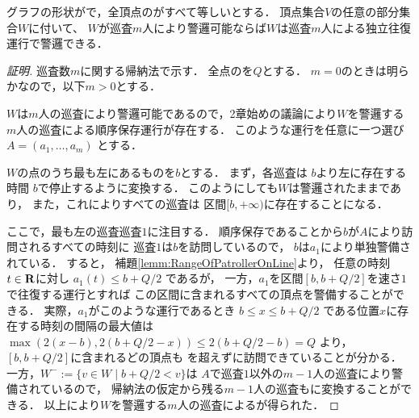 \begin{lemm}
\label{lemm:LineEqualTimelimitIndependentInterval}
グラフの形状が{\graphLine}で，全頂点の{\maxIdletime}がすべて等しいとする．
頂点集合$V$の任意の部分集合$W$に付いて、
$W$が巡査$m$人により警邏可能ならば$W$は巡査$m$人による独立往復運行で警邏できる．
\end{lemm}
\begin{proof}[証明]
\newcommand{\leftmostpoint}{b}  %
\newcommand{\newpatroller}{l}
\newcommand{\leftmostpatroller}{巡査1}
\newcommand{\leftmostpatOpr}{a_1}

巡査数$m$に関する帰納法で示す．
全点の{\maxIdletime}を$Q$とする．
$m = 0$のときは明らかなので，以下$m > 0$とする．

$W$は$m$人の巡査により警邏可能であるので，2章始めの議論により$W$を警邏する$m$人の巡査による順序保存運行が存在する．
このような運行を任意に一つ選び
$A = (a _1, \ldots, a _m)$
とする．

$W$の点のうち最も左にあるものを$\leftmostpoint$とする．
まず，各巡査は
$\leftmostpoint$より左に存在する時間
$\leftmostpoint$で停止するように変換する．
このようにしても$W$は警邏されたままであり，
また，これによりすべての巡査は
区間$[\leftmostpoint, +\infty)$に存在することになる．

ここで，最も左の巡査$\leftmostpatroller$に注目する．
順序保存であることから$\leftmostpoint$が$A$により訪問されるすべての時刻に
$\leftmostpatroller$は$\leftmostpoint$を訪問しているので，
$\leftmostpoint$は$\leftmostpatOpr$により単独警備されている．
%
すると，
補題\ref{lemm:RangeOfPatrollerOnLine}より，
任意の時刻$t \in \mathbf R$に対し
$\leftmostpatOpr(t) \leq \leftmostpoint + Q/2$
であるが，
%
一方，$\leftmostpatOpr$を区間$[b, b + Q/2]$を速さ$1$で往復する運行とすれば
この区間に含まれるすべての頂点を警備することができる．
実際，$\leftmostpatOpr$がこのような運行であるとき
$\leftmostpoint \leq x \leq \leftmostpoint + Q/2$
である位置$x$に存在する時刻の間隔の最大値は
$ \max( 2(x - \leftmostpoint), 2(\leftmostpoint + Q/2 - x) )
  \leq 2(\leftmostpoint + Q/2 - \leftmostpoint) = Q $
より，$[\leftmostpoint, \leftmostpoint + Q/2]$に含まれるどの頂点も
{\maxIdletime}を超えずに訪問できていることが分かる．
%
一方，$W^- := \{ v \in W \mid \leftmostpoint + Q/2 < v \}$は
$A$で$\leftmostpatroller$以外の$m - 1$人の巡査により警備されているので，
帰納法の仮定から残る$m - 1$人の巡査も{\indSectOperation}に変換することができる．
以上により$W$を警邏する$m$人の巡査による{\indSectOperation}が得られた．
\end{proof}


